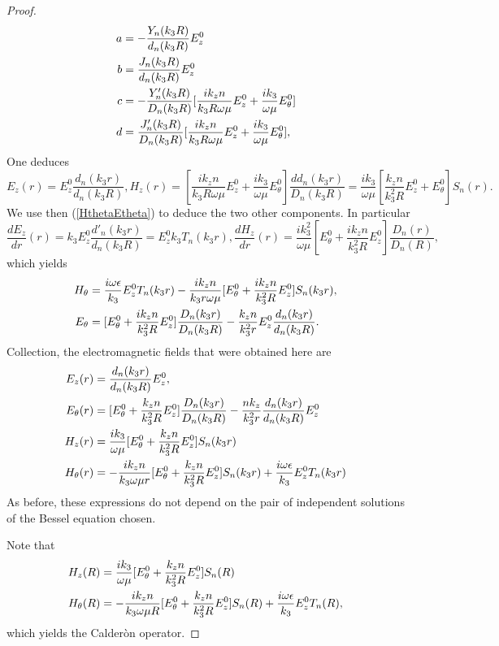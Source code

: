 \begin{proof}
            \begin{align*}
                a&=-\frac{Y_n(k_3R)}{d_n(k_3R)}E_z^0
                \cr
                b&=\frac{J_n(k_3R)}{d_n(k_3R)}E_z^0
                \cr
                c&=-\frac{Y'_n(k_3R)}{D_n(k_3R)}[\frac{ik_zn}{k_3R\omega \mu}E^0_z+\frac{ik_3}{\omega \mu}E_{\theta}^0]
                \cr
                d&=\frac{J'_n(k_3R)}{D_n(k_3R)}[\frac{ik_zn}{k_3R\omega \mu}E^0_z+\frac{ik_3}{\omega \mu}E_{\theta}^0],
            \end{align*}
            One deduces
            $$E_z(r)=E_z^0\frac{d_n(k_3r)}{d_n(k_3R)}, H_z(r)=[\frac{ik_zn}{k_3R\omega \mu}E^0_z+\frac{ik_3}{\omega \mu}E_{\theta}^0]\frac{dd_n(k_3r)}{D_n(k_3R)}=\frac{ik_3}{\omega \mu}[\frac{k_zn}{k_3^2R}E^0_z+E_{\theta}^0]S_n(r).$$
            We use then (\ref{HthetaEtheta}) to deduce the two other components. In particular
            $$\frac{dE_z}{dr}(r)=k_3E_z^0\frac{d'_n(k_3r)}{d_n(k_3R)}=E_z^0k_3T_n(k_3r),\frac{dH_z}{dr}(r)=\frac{ik_3^2}{\omega \mu}[E_{\theta}^0+\frac{ik_zn}{k_3^2R}E^0_z]\frac{D_n(r)}{D_n(R)},$$
            which yields
            \begin{align*}
                H_{\theta}&=\frac{i\omega \epsilon}{k_3}E_z^0T_n(k_3r)-\frac{ik_zn}{k_3r\omega \mu}[E_{\theta}^0+\frac{ik_zn}{k_3^2R}E^0_z]S_n(k_3r),
                \cr
                E_{\theta}&=[E_{\theta}^0+\frac{ik_zn}{k_3^2R}E^0_z]\frac{D_n(k_3r)}{D_n(k_3R)}-\frac{k_zn}{k_3^2r}E_z^0\frac{d_n(k_3r)}{d_n(k_3R)}.
            \end{align*}
            Collection, the electromagnetic fields that were obtained here are 
            \begin{align}
                E_z(r)&=\frac{d_n(k_3r)}{d_n(k_3R)}E_z^0,
                \cr
                E_{\theta}(r)&=[E_{\theta}^0+\frac{k_zn}{k_3^2R}E^0_z]\frac{D_n(k_3r)}{D_n(k_3R)}-\frac{nk_z}{k_3^2 r}\frac{d_n(k_3r)}{d_n(k_3R)}E_z^0
                \cr
                H_z(r)&=\frac{ik_3}{\omega \mu}[E_{\theta}^0+\frac{k_zn}{k_3^2R}E^0_z]S_n(k_3r)
                \cr
                H_{\theta}(r)&=-\frac{ik_zn}{k_3\omega \mu r}[E_{\theta}^0+\frac{k_zn}{k_3^2R}E^0_z]S_n(k_3r)+\frac{i\omega \epsilon}{k_3}E_z^0T_n(k_3r)
            \label{formal-solutions}
            \end{align}
            As before, these expressions do not depend on the pair of independent solutions of the Bessel equation chosen.

            Note that 
            \begin{align*}
                H_z(R)&=\frac{ik_3}{\omega \mu}[E_{\theta}^0+\frac{k_zn}{k_3^2R}E^0_z]S_n(R)
                \cr
                H_{\theta}(R)&=-\frac{ik_zn}{k_3\omega \mu R}[E_{\theta}^0+\frac{k_zn}{k_3^2R}E^0_z]S_n(R)+\frac{i\omega \epsilon}{k_3}E_z^0T_n(R),
            \end{align*}
            which yields the Calder\`on operator.
            \end{proof}

